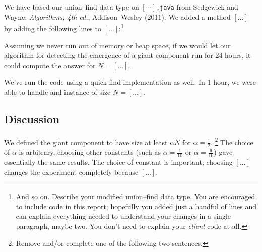 \documentclass{tufte-handout}
\begin{document}
We have based our union--find data type on $[\cdots]${\tt .java} from Sedgewick and Wayne: {\em Algorithms, 4th ed.}, Addison--Wesley (2011).
We added a method $[\ldots]$ by adding the following lines to $[\dots]$:\footnote{And so on. Describe your modified union--find data type.
You are encouraged to include code in this report; hopefully you added just a handful of lines and can explain everything needed to understand your changes in a single paragraph, maybe two. 
You don't need to explain your \emph{client} code at all.}

Assuming we never run out of memory or heap space, if we would let our algorithm for detecting the emergence of a giant component run for 24 hours, it could compute the answer for $N= [\ldots]$.

We've run the code using a quick-find implementation as well.
In 1 hour, we were able to handle and instance of size $N=[\ldots]$.



\subsection{Discussion}

We defined the giant component to have size at least $\alpha N$ for $\alpha = \frac{1}{2}$. \footnote{Remove and/or complete one of the following two sentences.}
The choice of $\alpha$ is arbitrary, choosing other constants (such as $\alpha=\frac{1}{10}$ or $\alpha=\frac{9}{10}$) gave essentially the same results.
The choice of constant is important; choosing $[\ldots]$ changes the experiment completely because $[\ldots]$.
\end{document}
